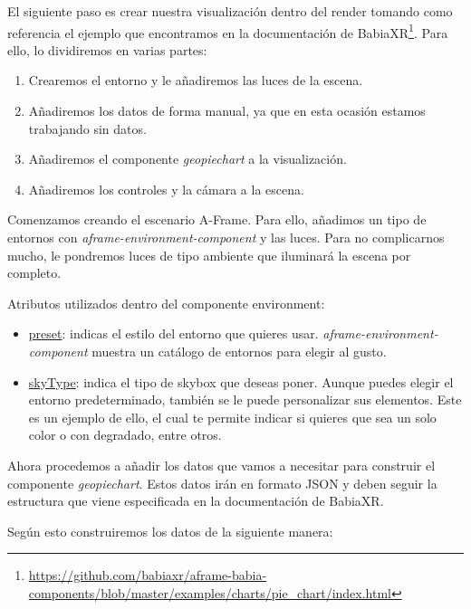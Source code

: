 \documentclass[a4paper, 12pt]{book}
\begin{document}
El siguiente paso es crear nuestra visualización dentro del render tomando como referencia el ejemplo que encontramos en la documentación de BabiaXR\footnote{\url{https://github.com/babiaxr/aframe-babia-components/blob/master/examples/charts/pie_chart/index.html}}. Para ello, lo dividiremos en varias partes:

\begin{enumerate}
    \item Crearemos el entorno y le añadiremos las luces de la escena.
    \item Añadiremos los datos de forma manual, ya que en esta ocasión estamos trabajando sin datos.
    \item Añadiremos el componente \textit{geopiechart} a la visualización.
    \item Añadiremos los controles y la cámara a la escena. 
\end{enumerate}

Comenzamos creando el escenario A-Frame. Para ello, añadimos un tipo de entornos con \textit{aframe-environment-component} y las luces. Para no complicarnos mucho, le pondremos luces de tipo ambiente que iluminará la escena por completo.



Atributos utilizados dentro del componente environment:

\begin{itemize}
    \item \underline{preset}: indicas el estilo del entorno que quieres usar. \textit{aframe-environment-component} muestra un catálogo de entornos para elegir al gusto.
    \item \underline{skyType}: indica el tipo de skybox que deseas poner. Aunque puedes elegir el entorno predeterminado, también se le puede personalizar sus elementos. Este es un ejemplo de ello, el cual te permite indicar si quieres que sea un solo color o con degradado, entre otros.
\end{itemize}

Ahora procedemos a añadir los datos que vamos a necesitar para construir el componente \textit{geopiechart}. Estos datos irán en formato JSON y deben seguir la estructura que viene especificada en la documentación de BabiaXR.



Según esto construiremos los datos de la siguiente manera:
\end{document}
